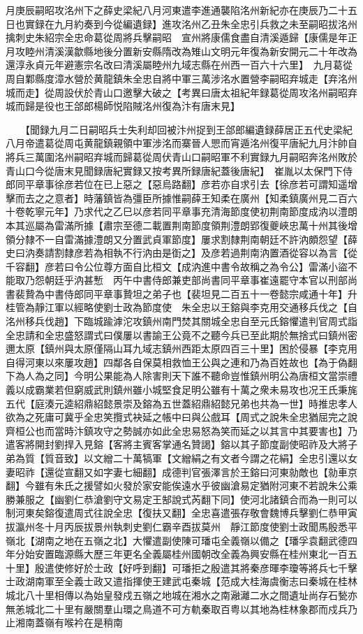 月庚辰嗣昭攻洺州下之薛史梁紀八月河東遣李進通襲陷洺州新紀亦在庚辰乃二十五日也實録在九月約奏到今從編遺録】進攻洺州乙丑朱全忠引兵救之未至嗣昭拔洺州擒刺史朱紹宗全忠命葛從周將兵擊嗣昭　宣州將康儒食盡自清溪遁歸【康儒是年正月攻睦州清溪漢歙縣地後分置新安縣隋改為雉山文明元年復為新安開元二十年改為還淳永貞元年避憲宗名改曰清溪屬睦州九域志縣在州西一百六十六里】　九月葛從周自鄴縣度漳水營於黄龍鎮朱全忠自將中軍三萬涉洺水置營李嗣昭弃城走【弃洺州城而走】從周設伏於青山口邀擊大破之【考異曰唐太祖紀年録葛從周攻洺州嗣昭弃城而歸是役也王郃郎楊師悦陷賊洺州復為汴有唐末見】

　　【聞録九月二日嗣昭兵士失利却回被汴州捉到王郃郎編遺録薛居正五代史梁紀八月帝遣葛從周屯黄龍鎮親領中軍涉洺而寨晉人愳而宵遁洺州復平唐紀九月汴帥自將兵三萬圍洺州嗣昭弃城而歸葛從周伏青山口嗣昭軍不利實録九月嗣昭奔洺州敗於青山口今從唐末見聞録唐紀實録又按考異所録唐紀蓋後唐紀】　崔胤以太保門下侍郎同平章事徐彦若位在已上惡之【惡烏路翻】彦若亦自求引去【徐彦若可謂知遥增擊而去之之意者】時藩鎮皆為彊臣所據惟嗣薛王知柔在廣州【知柔鎮廣州見二百六十卷乾寧元年】乃求代之乙巳以彦若同平章事充清海節度使初荆南節度成汭以澧朗本其巡屬為雷滿所據【肅宗至德二載置荆南節度領荆澧朗郢復夔峽忠萬十州其後增領分隸不一自雷滿據澧朗又分置武貞軍節度】屢求割隸荆南朝廷不許汭頗怨望【薛史曰汭奏請割隸彦若為相執不行汭由是衘之】及彦若過荆南汭置酒從容以為言【從千容翻】彦若曰令公位尊方面自比桓文【成汭進中書令故稱之為令公】雷滿小盜不能取乃怨朝廷乎汭甚慙　丙午中書侍郎兼吏部尚書同平章事崔遠罷守本官以刑部尚書裴贄為中書侍郎同平章事贄坦之弟子也【裴坦見二百五十一卷懿宗咸通十年】升桂管為靜江軍以經略使劉士政為節度使　朱全忠以王鎔與李克用交通移兵伐之【自洺州移兵伐趙】下臨城踰滹沱攻鎮州南門焚其關城全忠自至元氏鎔懼遣判官周式詣全忠請和全忠盛怒謂式曰僕屢以書諭王公竟不之聽今兵已至此期於無捨式曰鎮州密邇太原【鎮州與太原僅隔山耳九域志鎮州西距太原四百三十里】困於侵暴【李克用自得河東以來屢攻趙】四鄰各自保莫相救恤王公與之連和乃為百姓故也【為于偽翻下為人為之同】今明公果能為人除害則天下誰不聽命豈惟鎮州明公為唐桓文當崇禮義以成霸業若但窮威武則鎮州雖小城堅食足明公雖有十萬之衆未易攻也况王氏秉旄五代【庭湊元逵紹鼎紹懿景崇及鎔為五世蓋紹鼎紹懿兄弟也共為一世】時推忠孝人欲為之死庸可冀乎全忠笑攬式袂延之帳中曰與公戲耳【周式之說朱全忠猶屈完之說齊桓公也而當時汴鎮攻守之勢誠亦如此全忠易怒為笑而延之以其言中其要害也】乃遣客將開封劉捍入見鎔【客將主賓客掌通名贊謁】鎔以其子節度副使昭祚及大將子弟為質【質音致】以文繒二十萬犒軍【文繒絹之有文者今謂之花絹】全忠引還以女妻昭祚【還從宣翻又如字妻七細翻】成德判官張澤言於王鎔曰河東勍敵也【勍車京翻】今雖有朱氏之援譬如火發於家安能俟遠水乎彼幽滄易定猶附河東不若說朱公乘勝兼服之【幽劉仁恭滄劉守文易定王郜說式芮翻下同】使河北諸鎮合而為一則可以制河東矣鎔復遣周式往說全忠【復扶又翻】全忠喜遣張存敬會魏博兵擊劉仁恭甲寅拔瀛州冬十月丙辰拔景州執刺史劉仁霸辛酉拔莫州　靜江節度使劉士政聞馬殷悉平嶺北【湖南之地在五嶺之北】大懼遣副使陳可璠屯全義嶺以備之【璠孚袁翻武德四年分始安置臨源縣大歷三年更名全義屬桂州國朝改全義為興安縣在桂州東北一百五十里】殷遣使修好於士政【好呼到翻】可璠拒之殷遣其將秦彦暉李瓊等將兵七千擊士政湖南軍至全義士政又遣指揮使王建武屯秦城【范成大桂海虞衡志曰秦城在桂林城北八十里相傳以為始皇發戍五嶺之地城在湘水之南瀜灕二水之間遺址尚存石甃亦無恙城北二十里有嚴關羣山環之鳥道不可方軌秦取百粤以其地為桂林象郡而戍兵乃止湘南蓋嶺有喉衿在是稍南
